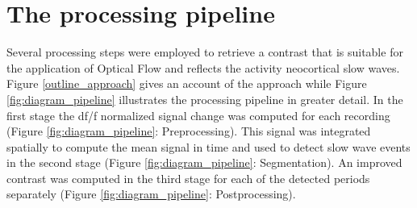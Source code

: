 \section{The processing pipeline}
Several processing steps were employed to retrieve a contrast that is suitable for the application of Optical Flow and reflects the activity neocortical slow waves. Figure \ref{outline_approach} gives an account of the approach while Figure \ref{fig:diagram_pipeline} illustrates the processing pipeline in greater detail. In the first stage the df/f normalized signal change was computed for each recording (Figure \ref{fig:diagram_pipeline}: Preprocessing). This signal was integrated spatially to compute the mean signal in time and used to detect slow wave events in the second stage (Figure \ref{fig:diagram_pipeline}: Segmentation). An improved contrast was computed in the third stage for each of the detected periods separately (Figure \ref{fig:diagram_pipeline}: Postprocessing).\\
